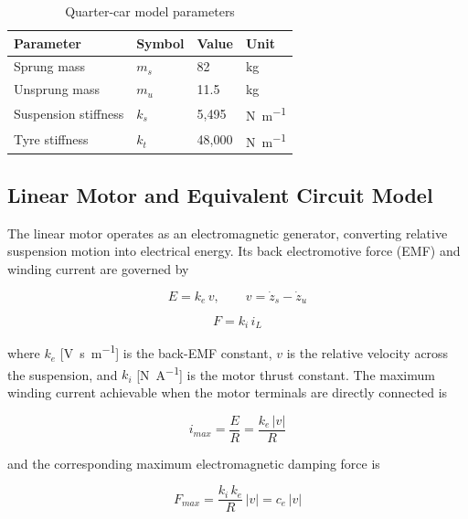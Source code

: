 \begin{table}[htbp]
    \centering
    \caption{Quarter-car model parameters}
    \label{tab:qcar_params}
    \renewcommand{\arraystretch}{1.3}
    \begin{tabular}{llll}
        \toprule
        Parameter & Symbol & Value & Unit \\
        \midrule
        Sprung mass          & $m_s$ & 82      & \si{\kilogram} \\
        Unsprung mass        & $m_u$ & 11.5    & \si{\kilogram} \\
        Suspension stiffness & $k_s$ & 5{,}495 & \si{\newton\per\metre} \\
        Tyre stiffness       & $k_t$ & 48{,}000 & \si{\newton\per\metre} \\
        \bottomrule
    \end{tabular}
\end{table}

\subsection{Linear Motor and Equivalent Circuit Model}
\label{subsec:motor}

The linear motor operates as an electromagnetic generator, converting
relative suspension motion into electrical energy. Its back
electromotive force (EMF) and winding current are governed by

\begin{equation}
    E = k_e\, v, \qquad v = \dot{z}_s - \dot{z}_u
    \label{eq:emf}
\end{equation}

\begin{equation}
    F = k_i\, i_L
    \label{eq:force}
\end{equation}

where $k_e$ [\si{\volt\second\per\metre}] is the back-EMF constant,
$v$ is the relative velocity across the suspension, and $k_i$
[\si{\newton\per\ampere}] is the motor thrust constant. The maximum
winding current achievable when the motor terminals are directly
connected is

\begin{equation}
    i_{max} = \frac{E}{R} = \frac{k_e\,|v|}{R}
    \label{eq:imax}
\end{equation}

and the corresponding maximum electromagnetic damping force is

\begin{equation}
    F_{max} = \frac{k_i\,k_e}{R}\,|v| = c_e\,|v|
    \label{eq:fmax}
\end{equation}

